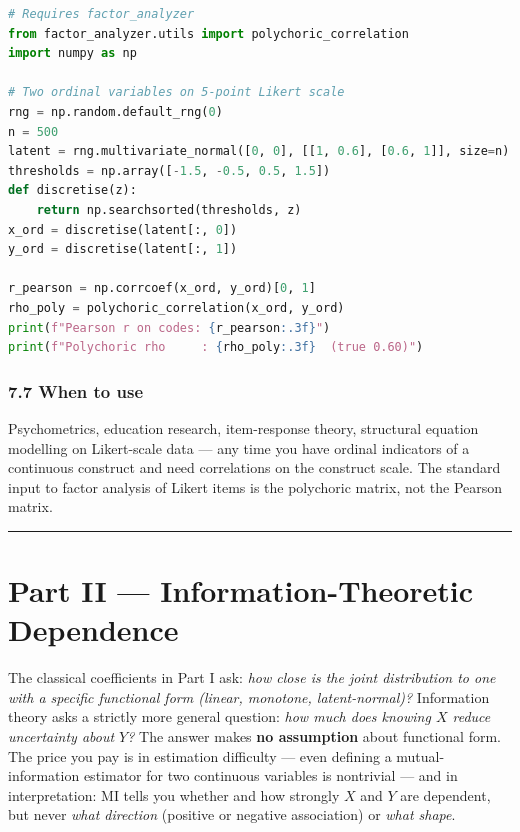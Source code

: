 \documentclass{article}
\let\oldsection\section
\renewcommand{\section}{\clearpage\oldsection}
\begin{document}
\begin{lstlisting}[language=Python]
# Requires factor_analyzer
from factor_analyzer.utils import polychoric_correlation
import numpy as np

# Two ordinal variables on 5-point Likert scale
rng = np.random.default_rng(0)
n = 500
latent = rng.multivariate_normal([0, 0], [[1, 0.6], [0.6, 1]], size=n)
thresholds = np.array([-1.5, -0.5, 0.5, 1.5])
def discretise(z):
    return np.searchsorted(thresholds, z)
x_ord = discretise(latent[:, 0])
y_ord = discretise(latent[:, 1])

r_pearson = np.corrcoef(x_ord, y_ord)[0, 1]
rho_poly = polychoric_correlation(x_ord, y_ord)
print(f"Pearson r on codes: {r_pearson:.3f}")
print(f"Polychoric rho     : {rho_poly:.3f}  (true 0.60)")
\end{lstlisting}

\subsubsection{7.7 When to use}\label{77-when-to-use}

Psychometrics, education research, item-response theory, structural
equation modelling on Likert-scale data --- any time you have ordinal
indicators of a continuous construct and need correlations on the
construct scale. The standard input to factor analysis of Likert items
is the polychoric matrix, not the Pearson matrix.

\begin{center}\rule{0.5\linewidth}{0.5pt}\end{center}

\section{Part II --- Information-Theoretic
Dependence}\label{part-ii--information-theoretic-dependence}

The classical coefficients in Part I ask: \emph{how close is the joint
distribution to one with a specific functional form (linear, monotone,
latent-normal)?} Information theory asks a strictly more general
question: \emph{how much does knowing \(X\) reduce uncertainty about
\(Y\)?} The answer makes \textbf{no assumption} about functional form.
The price you pay is in estimation difficulty --- even defining a
mutual-information estimator for two continuous variables is nontrivial
--- and in interpretation: MI tells you whether and how strongly \(X\)
and \(Y\) are dependent, but never \emph{what direction} (positive or
negative association) or \emph{what shape}.
\end{document}
